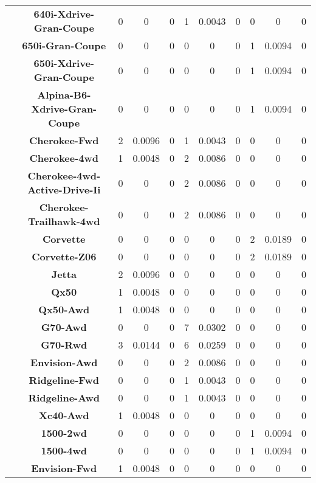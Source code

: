 \begin{center}
\begin{tabular}{|c|c||@{\hspace{1ex}}||c|c|c||@{\hspace{1ex}}||c|c|c||@{\hspace{1ex}}||c|c|c||@{\hspace{1ex}}||}
\cline{2-11}
  & {\bf 640i-Xdrive-Gran-Coupe} & 0 & 0 & 0 & 1 & 0.0043 & 0 & 0 & 0 & 0 \\
\cline{2-11}
  & {\bf 650i-Gran-Coupe} & 0 & 0 & 0 & 0 & 0 & 0 & 1 & 0.0094 & 0 \\
\cline{2-11}
  & {\bf 650i-Xdrive-Gran-Coupe} & 0 & 0 & 0 & 0 & 0 & 0 & 1 & 0.0094 & 0 \\
\cline{2-11}
  & {\bf Alpina-B6-Xdrive-Gran-Coupe} & 0 & 0 & 0 & 0 & 0 & 0 & 1 & 0.0094 & 0 \\
\cline{2-11}
  & {\bf Cherokee-Fwd} & 2 & 0.0096 & 0 & 1 & 0.0043 & 0 & 0 & 0 & 0 \\
\cline{2-11}
  & {\bf Cherokee-4wd} & 1 & 0.0048 & 0 & 2 & 0.0086 & 0 & 0 & 0 & 0 \\
\cline{2-11}
  & {\bf Cherokee-4wd-Active-Drive-Ii} & 0 & 0 & 0 & 2 & 0.0086 & 0 & 0 & 0 & 0 \\
\cline{2-11}
  & {\bf Cherokee-Trailhawk-4wd} & 0 & 0 & 0 & 2 & 0.0086 & 0 & 0 & 0 & 0 \\
\cline{2-11}
  & {\bf Corvette} & 0 & 0 & 0 & 0 & 0 & 0 & 2 & 0.0189 & 0 \\
\cline{2-11}
  & {\bf Corvette-Z06} & 0 & 0 & 0 & 0 & 0 & 0 & 2 & 0.0189 & 0 \\
\cline{2-11}
  & {\bf Jetta} & 2 & 0.0096 & 0 & 0 & 0 & 0 & 0 & 0 & 0 \\
\cline{2-11}
  & {\bf Qx50} & 1 & 0.0048 & 0 & 0 & 0 & 0 & 0 & 0 & 0 \\
\cline{2-11}
  & {\bf Qx50-Awd} & 1 & 0.0048 & 0 & 0 & 0 & 0 & 0 & 0 & 0 \\
\cline{2-11}
  & {\bf G70-Awd} & 0 & 0 & 0 & 7 & 0.0302 & 0 & 0 & 0 & 0 \\
\cline{2-11}
  & {\bf G70-Rwd} & 3 & 0.0144 & 0 & 6 & 0.0259 & 0 & 0 & 0 & 0 \\
\cline{2-11}
  & {\bf Envision-Awd} & 0 & 0 & 0 & 2 & 0.0086 & 0 & 0 & 0 & 0 \\
\cline{2-11}
  & {\bf Ridgeline-Fwd} & 0 & 0 & 0 & 1 & 0.0043 & 0 & 0 & 0 & 0 \\
\cline{2-11}
  & {\bf Ridgeline-Awd} & 0 & 0 & 0 & 1 & 0.0043 & 0 & 0 & 0 & 0 \\
\cline{2-11}
  & {\bf Xc40-Awd} & 1 & 0.0048 & 0 & 0 & 0 & 0 & 0 & 0 & 0 \\
\cline{2-11}
  & {\bf 1500-2wd} & 0 & 0 & 0 & 0 & 0 & 0 & 1 & 0.0094 & 0 \\
\cline{2-11}
  & {\bf 1500-4wd} & 0 & 0 & 0 & 0 & 0 & 0 & 1 & 0.0094 & 0 \\
\cline{2-11}
  & {\bf Envision-Fwd} & 1 & 0.0048 & 0 & 0 & 0 & 0 & 0 & 0 & 0 \\

\end{tabular}
\end{center}
